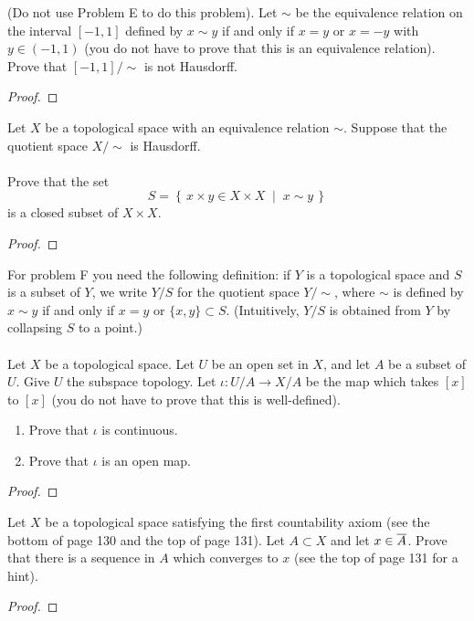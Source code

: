 \newpage
\begin{problem}[D]
(Do not use Problem E to do this problem). Let $\sim$ be the
equivalence relation on the interval $[-1,1]$ defined by $x\sim
y$ if and only if $x=y$ or $x=-y$ with $y\in(-1,1)$ (you do not
have to prove that this is an equivalence relation). Prove that
$[-1,1]/\sim$ is not Hausdorff.
\end{problem}
\begin{proof}
\end{proof}
\newpage
\begin{problem}[E]
Let $X$ be a topological space with an equivalence relation
$\sim$. Suppose that the quotient space $X/\sim$ is Hausdorff.
\\\\
Prove that the set
\[
S=\left\{\,x\times y\in X\times X\;\middle|\;x\sim y\,\right\}
\]
is a closed subset of $X\times X$.
\end{problem}
\begin{proof}
\end{proof}
\newpage
\begin{problem}[F]
For problem F you need the following definition: if $Y$ is a
topological space and $S$ is a subset of $Y$, we write $Y/S$ for
the quotient space $Y/{\sim}$, where $\sim$ is defined by $x\sim y$
if and only if $x=y$ or $\{x,y\}\subset S$. (Intuitively, $Y/S$
is obtained from $Y$ by collapsing $S$ to a point.)
\\\\
Let $X$ be a topological space. Let $U$ be an open set in $X$,
and let $A$ be a subset of $U$. Give $U$ the subspace
topology. Let $\iota\colon U/A\to X/A$ be the map which takes
$[x]$ to $[x]$ (you do not have to prove that this is
well-defined).
\begin{enumerate}[noitemsep,label=(\roman*)]
\item Prove that $\iota$ is continuous.
\item Prove that $\iota$ is an open map.
\end{enumerate}
\end{problem}
\begin{proof}
\end{proof}
\newpage
\begin{problem}[G]
Let $X$ be a topological space satisfying the first countability
axiom (see the bottom of page 130 and the top of page 131). Let
$A\subset X$ and let $x\in\overline{A}$. Prove that there is a
sequence in $A$ which converges to $x$ (see the top of page 131
for a hint).
\end{problem}
\begin{proof}
\end{proof}


